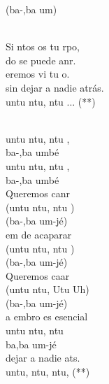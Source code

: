 \begin{cancion}
	(ba-,ba um)\\\jump\\
	\begin{chorus}%
	Si ntos os tu rpo,\\
	do se puede anr.\\
	eremos vi tu o. \\
sin dejar a nadie atrás.\\
	untu ntu, ntu ... (**)\\
	\end{chorus}%
	\jump\\
	untu ntu, ntu ,\\
	ba-,ba umbé\\
	untu ntu, ntu ,\\
	ba-,ba umbé\\
	Queremos canr\\
	(untu ntu, ntu )\\
	(ba-,ba um-jé)\\
\jump
	em de acaparar\\
	(untu ntu, ntu )\\
	(ba-,ba um-jé)\\
\jump
	Queremos caar\\
	(untu ntu, Utu Uh)\\
	(ba-,ba um-jé)\\
\jump
	a embro es esencial\\
	untu ntu, ntu \\
	ba,ba um-jé\\
\jump
	 dejar a nadie ats. \\
	untu, ntu, ntu,  (**)\\
\end{cancion}%

